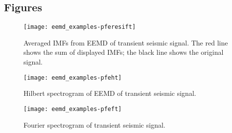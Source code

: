 \documentclass[12pt]{article}
\begin{document}
\subsection{Figures}

\FloatBarrier

\begin{figure}[ht]
\begin{center}
\texttt{[image: eemd\_examples-pferesift]}
\end{center}
\caption{Averaged IMFs from EEMD of transient seismic signal.
The red line shows the sum of displayed IMFs; the black line shows the original signal.}
\label{fig:pferesift}
\end{figure}

\begin{figure}[ht]
\begin{center}
\texttt{[image: eemd\_examples-pfeht]}
\end{center}
\caption{Hilbert spectrogram of EEMD of transient seismic signal.}
\label{fig:pfeht}
\end{figure}

\begin{figure}[ht]
\begin{center}
\texttt{[image: eemd\_examples-pfeft]}
\end{center}
\caption{Fourier spectrogram of transient seismic signal.}
\label{fig:pfeft}
\end{figure}
\end{document}
